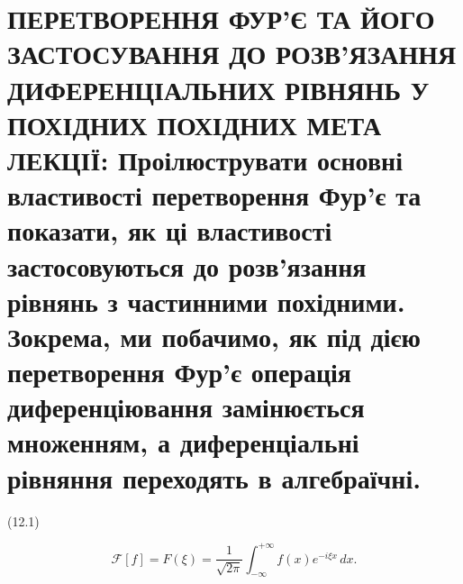 \documentclass[
  ukrainian,
]{article}
\begin{document}
\section{ПЕРЕТВОРЕННЯ ФУР'Є ТА ЙОГО ЗАСТОСУВАННЯ ДО РОЗВ'ЯЗАННЯ
ДИФЕРЕНЦІАЛЬНИХ РІВНЯНЬ У ПОХІДНИХ ПОХІДНИХ МЕТА ЛЕКЦІЇ: Проілюструвати
основні властивості перетворення Фур'є та показати, як ці властивості
застосовуються до розв'язання рівнянь з частинними похідними. Зокрема,
ми побачимо, як під дією перетворення Фур'є операція диференціювання
замінюється множенням, а диференціальні рівняння переходять в
алгебраїчні.}\label{ux43fux435ux440ux435ux442ux432ux43eux440ux435ux43dux43dux44f-ux444ux443ux440ux454-ux442ux430-ux439ux43eux433ux43e-ux437ux430ux441ux442ux43eux441ux443ux432ux430ux43dux43dux44f-ux434ux43e-ux440ux43eux437ux432ux44fux437ux430ux43dux43dux44f-ux434ux438ux444ux435ux440ux435ux43dux446ux456ux430ux43bux44cux43dux438ux445-ux440ux456ux432ux43dux44fux43dux44c-ux443-ux43fux43eux445ux456ux434ux43dux438ux445-ux43fux43eux445ux456ux434ux43dux438ux445-ux43cux435ux442ux430-ux43bux435ux43aux446ux456ux457-ux43fux440ux43eux456ux43bux44eux441ux442ux440ux443ux432ux430ux442ux438-ux43eux441ux43dux43eux432ux43dux456-ux432ux43bux430ux441ux442ux438ux432ux43eux441ux442ux456-ux43fux435ux440ux435ux442ux432ux43eux440ux435ux43dux43dux44f-ux444ux443ux440ux454-ux442ux430-ux43fux43eux43aux430ux437ux430ux442ux438-ux44fux43a-ux446ux456-ux432ux43bux430ux441ux442ux438ux432ux43eux441ux442ux456-ux437ux430ux441ux442ux43eux441ux43eux432ux443ux44eux442ux44cux441ux44f-ux434ux43e-ux440ux43eux437ux432ux44fux437ux430ux43dux43dux44f-ux440ux456ux432ux43dux44fux43dux44c-ux437-ux447ux430ux441ux442ux438ux43dux43dux438ux43cux438-ux43fux43eux445ux456ux434ux43dux438ux43cux438.-ux437ux43eux43aux440ux435ux43cux430-ux43cux438-ux43fux43eux431ux430ux447ux438ux43cux43e-ux44fux43a-ux43fux456ux434-ux434ux456ux454ux44e-ux43fux435ux440ux435ux442ux432ux43eux440ux435ux43dux43dux44f-ux444ux443ux440ux454-ux43eux43fux435ux440ux430ux446ux456ux44f-ux434ux438ux444ux435ux440ux435ux43dux446ux456ux44eux432ux430ux43dux43dux44f-ux437ux430ux43cux456ux43dux44eux454ux442ux44cux441ux44f-ux43cux43dux43eux436ux435ux43dux43dux44fux43c-ux430-ux434ux438ux444ux435ux440ux435ux43dux446ux456ux430ux43bux44cux43dux456-ux440ux456ux432ux43dux44fux43dux43dux44f-ux43fux435ux440ux435ux445ux43eux434ux44fux442ux44c-ux432-ux430ux43bux433ux435ux431ux440ux430ux457ux447ux43dux456.}

(12.1)

\[
\mathcal{F}[f] = F(\xi) = \frac{1}{\sqrt{2\pi}} \int_{-\infty}^{+\infty} f(x)e^{-i\xi x}\,dx.
\]
\end{document}
